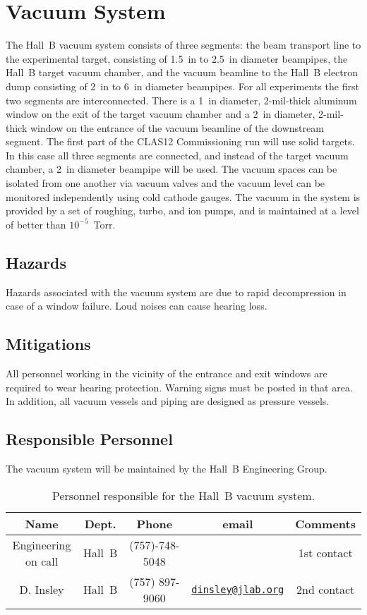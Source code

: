 \section{Vacuum System}

The Hall~B vacuum system consists of three segments: the beam transport line to the 
experimental target, consisting of 1.5~in to 2.5~in diameter beampipes, the Hall~B 
target vacuum chamber, and the vacuum beamline to the Hall~B electron dump consisting of 
2~in to 6~in diameter beampipes. For all experiments the first two segments are 
interconnected. There is a 1~in diameter, 2-mil-thick aluminum window on the exit of the 
target vacuum chamber and a 2~in diameter, 2-mil-thick window on the entrance of the 
vacuum beamline of the downstream segment. The first part of the CLAS12 Commissioning run 
will use solid targets. In this case all three segments are connected, and instead of the 
target vacuum chamber, a 2~in diameter beampipe will be used. The vacuum spaces can be 
isolated from one another via vacuum valves and the vacuum level can be monitored 
independently using cold cathode gauges. The vacuum in the system is provided by a set of 
roughing, turbo, and ion pumps, and is maintained at a level of better than 
$10^{-5}$~Torr. 

\subsection{Hazards} 

Hazards associated with the vacuum system are due to rapid decompression in case of a window 
failure. Loud noises can cause hearing loss. 

\subsection{Mitigations}

All personnel working in the vicinity of the entrance and exit windows are required to wear 
hearing protection. Warning signs must be posted in that area. In addition, all vacuum vessels 
and piping are designed as pressure vessels.   

\subsection{Responsible Personnel}

The vacuum system will be maintained by the Hall~B Engineering Group.  

\begin{table}[!htb]
\centering
\begin{tabular}{|c|c|c|c|c|} \hline
Name&Dept.&Phone&email&Comments \\ \hline
Engineering on call & Hall~B& (757)-748-5048&& 1st contact  \\ \hline
D. Insley & Hall~B&(757) 897-9060&\href{mailto:dinsley@jlab.org}{\nolinkurl{dinsley@jlab.org}}  &2nd contact \\ \hline
 \end{tabular}
\caption{Personnel responsible for the Hall~B vacuum system.} 
\label{tb:vacuum}
\end{table}


